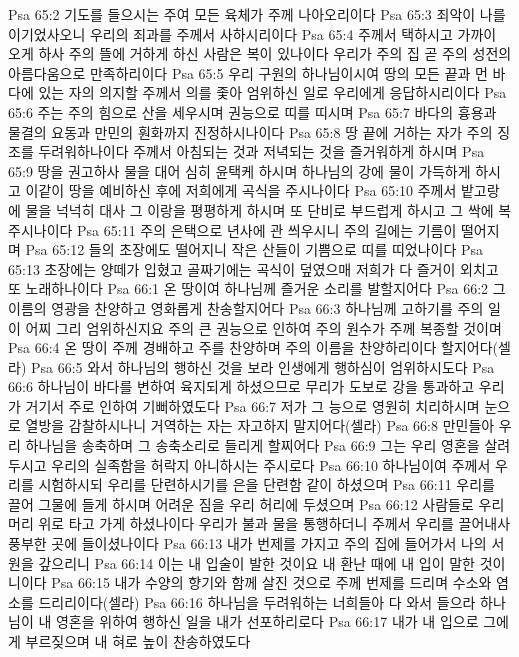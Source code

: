 Psa 65:2  기도를 들으시는 주여 모든 육체가 주께 나아오리이다
Psa 65:3  죄악이 나를 이기었사오니 우리의 죄과를 주께서 사하시리이다
Psa 65:4  주께서 택하시고 가까이 오게 하사 주의 뜰에 거하게 하신 사람은 복이 있나이다 우리가 주의 집 곧 주의 성전의 아름다움으로 만족하리이다
Psa 65:5  우리 구원의 하나님이시여 땅의 모든 끝과 먼 바다에 있는 자의 의지할 주께서 의를 좇아 엄위하신 일로 우리에게 응답하시리이다
Psa 65:6  주는 주의 힘으로 산을 세우시며 권능으로 띠를 띠시며
Psa 65:7  바다의 흉용과 물결의 요동과 만민의 훤화까지 진정하시나이다
Psa 65:8  땅 끝에 거하는 자가 주의 징조를 두려워하나이다 주께서 아침되는 것과 저녁되는 것을 즐거워하게 하시며
Psa 65:9  땅을 권고하사 물을 대어 심히 윤택케 하시며 하나님의 강에 물이 가득하게 하시고 이같이 땅을 예비하신 후에 저희에게 곡식을 주시나이다
Psa 65:10  주께서 밭고랑에 물을 넉넉히 대사 그 이랑을 평평하게 하시며 또 단비로 부드럽게 하시고 그 싹에 복주시나이다
Psa 65:11  주의 은택으로 년사에 관 씌우시니 주의 길에는 기름이 떨어지며
Psa 65:12  들의 초장에도 떨어지니 작은 산들이 기쁨으로 띠를 띠었나이다
Psa 65:13  초장에는 양떼가 입혔고 골짜기에는 곡식이 덮였으매 저희가 다 즐거이 외치고 또 노래하나이다
Psa 66:1  온 땅이여 하나님께 즐거운 소리를 발할지어다
Psa 66:2  그 이름의 영광을 찬양하고 영화롭게 찬송할지어다
Psa 66:3  하나님께 고하기를 주의 일이 어찌 그리 엄위하신지요 주의 큰 권능으로 인하여 주의 원수가 주께 복종할 것이며
Psa 66:4  온 땅이 주께 경배하고 주를 찬양하며 주의 이름을 찬양하리이다 할지어다(셀라)
Psa 66:5  와서 하나님의 행하신 것을 보라 인생에게 행하심이 엄위하시도다
Psa 66:6  하나님이 바다를 변하여 육지되게 하셨으므로 무리가 도보로 강을 통과하고 우리가 거기서 주로 인하여 기뻐하였도다
Psa 66:7  저가 그 능으로 영원히 치리하시며 눈으로 열방을 감찰하시나니 거역하는 자는 자고하지 말지어다(셀라)
Psa 66:8  만민들아 우리 하나님을 송축하며 그 송축소리로 들리게 할찌어다
Psa 66:9  그는 우리 영혼을 살려 두시고 우리의 실족함을 허락지 아니하시는 주시로다
Psa 66:10  하나님이여 주께서 우리를 시험하시되 우리를 단련하시기를 은을 단련함 같이 하셨으며
Psa 66:11  우리를 끌어 그물에 들게 하시며 어려운 짐을 우리 허리에 두셨으며
Psa 66:12  사람들로 우리 머리 위로 타고 가게 하셨나이다 우리가 불과 물을 통행하더니 주께서 우리를 끌어내사 풍부한 곳에 들이셨나이다
Psa 66:13  내가 번제를 가지고 주의 집에 들어가서 나의 서원을 갚으리니
Psa 66:14  이는 내 입술이 발한 것이요 내 환난 때에 내 입이 말한 것이니이다
Psa 66:15  내가 수양의 향기와 함께 살진 것으로 주께 번제를 드리며 수소와 염소를 드리리이다(셀라)
Psa 66:16  하나님을 두려워하는 너희들아 다 와서 들으라 하나님이 내 영혼을 위하여 행하신 일을 내가 선포하리로다
Psa 66:17  내가 내 입으로 그에게 부르짖으며 내 혀로 높이 찬송하였도다
